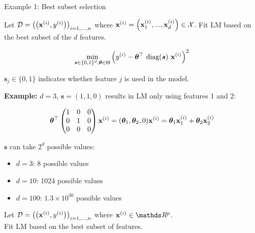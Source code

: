 \documentclass[11pt,compress,t,notes=noshow, xcolor=table]{beamer}
\begin{document}
\begin{vbframe}{Example 1: Best subset selection}

Let $\mathcal{D} = \left(\left(\mathbf{x}^{(i)}, y^{(i)}\right)\right)_{i = 1, ..., n}$ where $\mathbf{x}^{(i)} = \left(\mathbf{x}^{(i)}_1, ..., \mathbf{x}^{(i)}_d\right) \in \mathcal{X}$. Fit LM based on the best subset of the $d$ features. 

\vspace*{-0.5cm}
\begin{eqnarray*}
	\min_{\bm{s} \in \{0, 1\}^d, \bm{\theta} \in \Theta} \left(y^{(i)} - \bm{\theta}^\top ~\text{diag}(\bm{s})~\mathbf{x}^{(i)}\right)^2 \\
\end{eqnarray*}

\vspace*{-0.5cm}

$\bm{s}_j \in \{0, 1\}$ indicates whether feature $j$ is used in the model.

\lz 

\begin{footnotesize}
\textbf{Example:} $d = 3$, $\bm{s} = (1, 1, 0)$ results in LM only using features 1 and 2:

\begin{eqnarray*}
	\bm{\theta}^\top \begin{pmatrix} 1 & 0 & 0 \\
	0 & 1 & 0 \\
	0 & 0 & 0 
	\end{pmatrix} \mathbf{x}^{(i)} = (\bm{\theta}_1, \bm{\theta}_2, 0) \mathbf{x}^{(i)} = \bm{\theta}_1 \mathbf{x}^{(i)}_1 + \bm{\theta}_2 \mathbf{x}^{(i)}_2
\end{eqnarray*}

$\bm{s}$ can take $2^d$ possible values: 

\begin{itemize}
	\item $d = 3$: 8 possible values
	\item $d = 10$: 1024 possible values
	\item $d = 100$: $1.3 \times 10^{30}$ possible values	
\end{itemize}

\end{footnotesize}



\framebreak 

Let $\mathcal{D} = \left(\left(\mathbf{x}^{(i)}, y^{(i)}\right)\right)_{i = 1, ..., n}$ where $\xi \in \R^p$.\\Fit LM based on the best subset of features. 



\end{vbframe}
\end{document}
